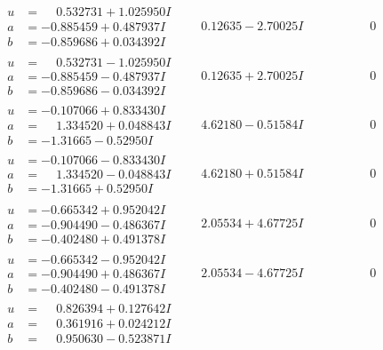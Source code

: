 \documentclass[1p]{elsarticle_modified}
\theoremstyle{definition}
\begin{document}
$$\begin{array}{c|c|c}
 \hline 
\begin{aligned}
u &= \phantom{-}0.532731 + 1.025950 I \\
a &= -0.885459 + 0.487937 I \\
b &= -0.859686 + 0.034392 I\end{aligned}
 & \phantom{-}0.12635 - 2.70025 I & \phantom{-0.000000 } 0 \\ \hline\begin{aligned}
u &= \phantom{-}0.532731 - 1.025950 I \\
a &= -0.885459 - 0.487937 I \\
b &= -0.859686 - 0.034392 I\end{aligned}
 & \phantom{-}0.12635 + 2.70025 I & \phantom{-0.000000 } 0 \\ \hline\begin{aligned}
u &= -0.107066 + 0.833430 I \\
a &= \phantom{-}1.334520 + 0.048843 I \\
b &= -1.31665 - 0.52950 I\end{aligned}
 & \phantom{-}4.62180 - 0.51584 I & \phantom{-0.000000 } 0 \\ \hline\begin{aligned}
u &= -0.107066 - 0.833430 I \\
a &= \phantom{-}1.334520 - 0.048843 I \\
b &= -1.31665 + 0.52950 I\end{aligned}
 & \phantom{-}4.62180 + 0.51584 I & \phantom{-0.000000 } 0 \\ \hline\begin{aligned}
u &= -0.665342 + 0.952042 I \\
a &= -0.904490 - 0.486367 I \\
b &= -0.402480 + 0.491378 I\end{aligned}
 & \phantom{-}2.05534 + 4.67725 I & \phantom{-0.000000 } 0 \\ \hline\begin{aligned}
u &= -0.665342 - 0.952042 I \\
a &= -0.904490 + 0.486367 I \\
b &= -0.402480 - 0.491378 I\end{aligned}
 & \phantom{-}2.05534 - 4.67725 I & \phantom{-0.000000 } 0 \\ \hline\begin{aligned}
u &= \phantom{-}0.826394 + 0.127642 I \\
a &= \phantom{-}0.361916 + 0.024212 I \\
b &= \phantom{-}0.950630 - 0.523871 I\end{aligned}

\end{array}$$
\end{document}
